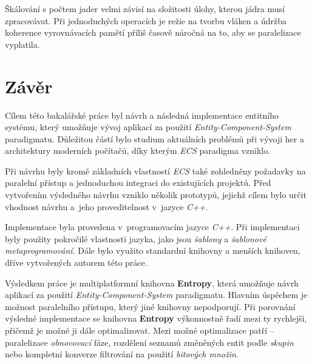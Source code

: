 Škálování s počtem jader velmi závisí na složitosti úlohy, kterou jádra musí zpracovávat. Při jednoduchých operacích je režie na tvorbu vláken a údržba koherence vyrovnávacích pamětí příliš časově náročná na to, aby se paralelizace vyplatila.

\chapter{Závěr}

Cílem této bakalářské práce byl návrh a následná implementace entitního systému, který umožňuje vývoj aplikací za použití \emph{Entity-Component-System} paradigmatu. Důležitou částí bylo studium aktuálních problémů při vývoji her a architektury moderních počítačů, díky kterým \emph{ECS} paradigma vzniklo. 

Při návrhu byly kromě základních vlastností \emph{ECS} také zohledněny požadavky na paralelní přístup a jednoduchou integraci do existujících projektů. Před vytvořením výsledného návrhu vzniklo několik prototypů, jejichž cílem bylo určit vhodnost návrhu a~jeho proveditelnost v~jazyce \emph{C++}. 


Implementace byla provedena v~programovacím jazyce \emph{C++}. Při implementaci byly použity pokročilé vlastnosti jazyka, jako jsou \emph{šablony} a \emph{šablonové metaprogramování}. Dále bylo využito standardní knihovny a menších knihoven, dříve vytvořených autorem této práce. 



Výsledkem práce je multiplatformní knihovna \textbf{Entropy}, která umožňuje návrh aplikací za použití \emph{Entity-Component-System} paradigmatu. Hlavním úspěchem je možnost paralelního přístupu, který jiné knihovny nepodporují. Při porovnání výsledné implementace se knihovna \textbf{Entropy} výkonnostně řadí mezi ty rychlejší, přičemž je možné ji dále optimalizovat. Mezi možné optimalizace patří -- paralelizace \emph{obnovovací} fáze, rozdělení seznamů změněných entit podle \emph{skupin} nebo kompletní konverze filtrování na použití \emph{bitových množin}.

